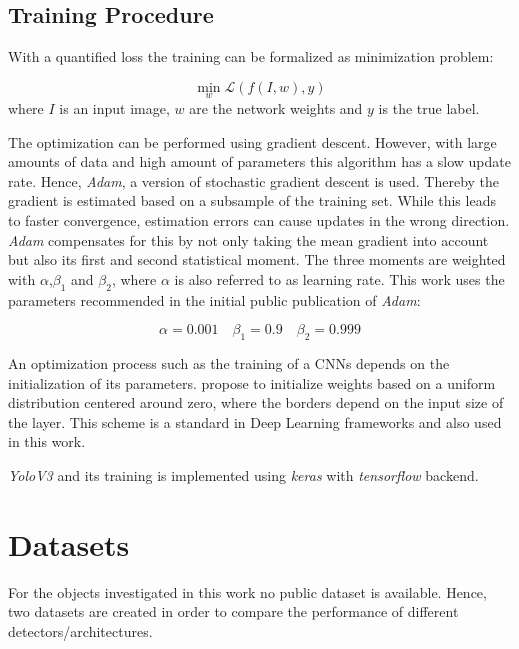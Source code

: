 \subsection{Training Procedure}

With a quantified loss the training can be formalized as minimization problem: 

\begin{equation}
	\min\limits_{w}	\mathcal{L}(f(I,w),y)
\end{equation}
where $I$ is an input image, $w$ are the network weights and $y$ is the true label.

The optimization can be performed using gradient descent. However, with large amounts of data and high amount of parameters this algorithm has a slow update rate. Hence, \textit{Adam}\cite{Kingma2014}, a version of stochastic gradient descent is used. Thereby the gradient is estimated based on a subsample of the training set. While this leads to faster convergence, estimation errors can cause updates in the wrong direction. \textit{Adam} compensates for this by not only taking the mean gradient into account but also its first and second statistical moment. The three moments are weighted with $\alpha$,$\beta_1$ and $\beta_2$, where $\alpha$ is also referred to as learning rate. This work uses the parameters recommended in the initial public publication of \textit{Adam}\cite{Kingma2014}:

$$\alpha=0.001 \quad \beta_1=0.9 \quad \beta_2=0.999$$

An optimization process such as the training of a \acp{CNN} depends on the initialization of its parameters. \citeauthor{Glorot2010} \cite{Glorot2010} propose to initialize weights based on a uniform distribution centered around zero, where the borders depend on the input size of the layer. This scheme is a standard in Deep Learning frameworks and also used in this work.

\textit{YoloV3} and its training is implemented using \textit{keras} \cite{keras} with \textit{tensorflow} \cite{tensorflow} backend. 

\section{Datasets}
\label{sec:datasets}

For the objects investigated in this work no public dataset is available. Hence, two datasets are created in order to compare the performance of different detectors/architectures.

